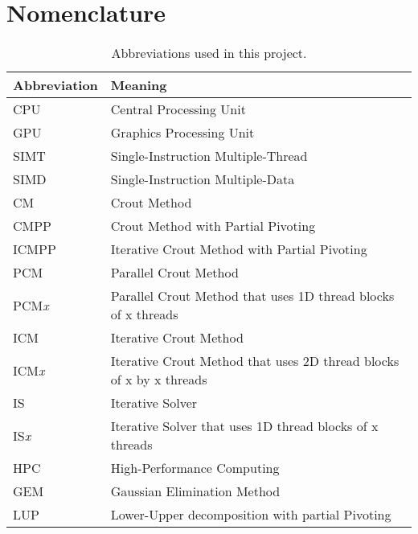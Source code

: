 \chapter*{Nomenclature}		 		 		 %

\begin{table}[ht]
	\begin{tabular}{l|l}
		\hline
		Abbreviation  & Meaning                                                             \\ \hline
		CPU			  & Central Processing Unit                                             \\
		GPU			  & Graphics Processing Unit                                            \\
		SIMT		  & Single-Instruction Multiple-Thread                                  \\
		SIMD		  & Single-Instruction Multiple-Data                                    \\
		CM            & Crout Method                                                        \\
		CMPP          & Crout Method with Partial Pivoting                                 	\\
		ICMPP         & Iterative Crout Method with Partial Pivoting                        \\
		PCM           & Parallel Crout Method                                               \\
		PCM\textit{x} & Parallel Crout Method that uses 1D thread blocks of x threads       \\
		ICM           & Iterative Crout Method                                              \\
		ICM\textit{x} & Iterative Crout Method that uses 2D thread blocks of x by x threads \\
		IS            & Iterative Solver                                                    \\
		IS\textit{x}  & Iterative Solver that uses 1D thread blocks of x threads            \\
		HPC           & High-Performance Computing                                          \\
		GEM           & Gaussian Elimination Method                                         \\
		LUP           & Lower-Upper decomposition with partial Pivoting                     \\ \hline
	\end{tabular}
	\caption{Abbreviations used in this project.}
	\label{Table:nomenclature}
\end{table}